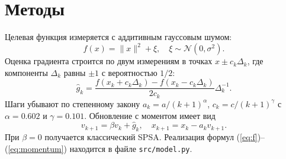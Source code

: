 \section{Методы}\label{sec:methods}
Целевая функция измеряется с аддитивным гауссовым шумом:
\begin{equation}\label{eq:f}
f(x) = \|x\|^2 + \xi, \quad \xi \sim \mathcal{N}(0, \sigma^2).
\end{equation}
Оценка градиента строится по двум измерениям в точках $x \pm c_k \Delta_k$, где компоненты
$\Delta_k$ равны $\pm 1$ с вероятностью $1/2$:
\begin{equation}\label{eq:grad}
\hat g_k = \frac{f(x_k + c_k \Delta_k) - f(x_k - c_k \Delta_k)}{2 c_k} \Delta_k^{-1}.
\end{equation}
Шаги убывают по степенному закону $a_k = a/(k+1)^{\alpha}$, $c_k = c/(k+1)^{\gamma}$ с
$\alpha = 0.602$ и $\gamma = 0.101$.
Обновление с моментом имеет вид
\begin{equation}\label{eq:momentum}
v_{k+1} = \beta v_k + \hat g_k, \quad x_{k+1} = x_k - a_k v_{k+1}.
\end{equation}
При $\beta = 0$ получается классический SPSA.
Реализация формул (\ref{eq:f})--(\ref{eq:momentum}) находится в файле \texttt{src/model.py}.
